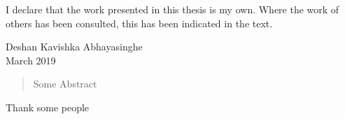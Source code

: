 
\cleardoublepage{}
\begin{declaration}
    I declare that the work presented in this thesis is my own.
    Where the work of others has been consulted, this has been indicated in the text.
    \vspace*{1.5cm}
    \begin{flushright}
        Deshan Kavishka Abhayasinghe \\
        March 2019
    \end{flushright}
\end{declaration}

\begin{abstract}
   Some Abstract
\end{abstract}


\cleardoublepage{}
\begin{acknowledgements}
    Thank some people
\end{acknowledgements}

\cleardoublepage{}\tableofcontents
\cleardoublepage{}\listoffigures
\cleardoublepage{}\listoftables

\dedication{}

